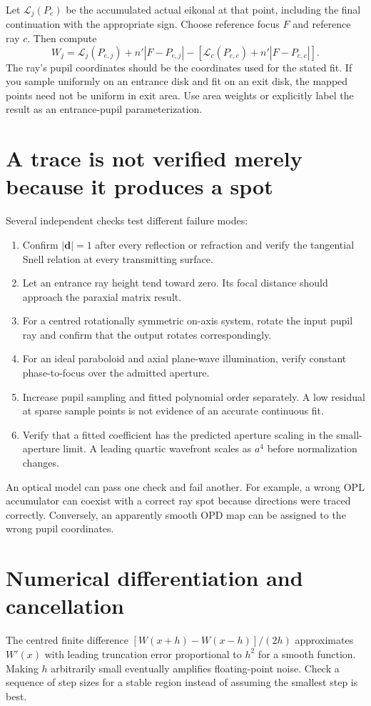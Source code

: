 Let $\mathcal{L}_j(P_e)$ be the accumulated actual eikonal at that point, including the final continuation with the appropriate sign. Choose reference focus $F$ and reference ray $c$. Then compute
\begin{equation}
W_j=\mathcal{L}_j(P_{e,j})+n'|F-P_{e,j}|
-\left[\mathcal{L}_c(P_{e,c})+n'|F-P_{e,c}|\right].
\label{fnd:trace-opd}
\end{equation}
The ray's pupil coordinates should be the coordinates used for the stated fit. If you sample uniformly on an entrance disk and fit on an exit disk, the mapped points need not be uniform in exit area. Use area weights or explicitly label the result as an entrance-pupil parameterization.

\section{A trace is not verified merely because it produces a spot}
Several independent checks test different failure modes:
\begin{enumerate}
\item Confirm $|\bm{d}|=1$ after every reflection or refraction and verify the tangential Snell relation at every transmitting surface.
\item Let an entrance ray height tend toward zero. Its focal distance should approach the paraxial matrix result.
\item For a centred rotationally symmetric on-axis system, rotate the input pupil ray and confirm that the output rotates correspondingly.
\item For an ideal paraboloid and axial plane-wave illumination, verify constant phase-to-focus over the admitted aperture.
\item Increase pupil sampling and fitted polynomial order separately. A low residual at sparse sample points is not evidence of an accurate continuous fit.
\item Verify that a fitted coefficient has the predicted aperture scaling in the small-aperture limit. A leading quartic wavefront scales as $a^4$ before normalization changes.
\end{enumerate}
An optical model can pass one check and fail another. For example, a wrong OPL accumulator can coexist with a correct ray spot because directions were traced correctly. Conversely, an apparently smooth OPD map can be assigned to the wrong pupil coordinates.

\section{Numerical differentiation and cancellation}
The centred finite difference $[W(x+h)-W(x-h)]/(2h)$ approximates $W'(x)$ with leading truncation error proportional to $h^2$ for a smooth function. Making $h$ arbitrarily small eventually amplifies floating-point noise. Check a sequence of step sizes for a stable region instead of assuming the smallest step is best.

